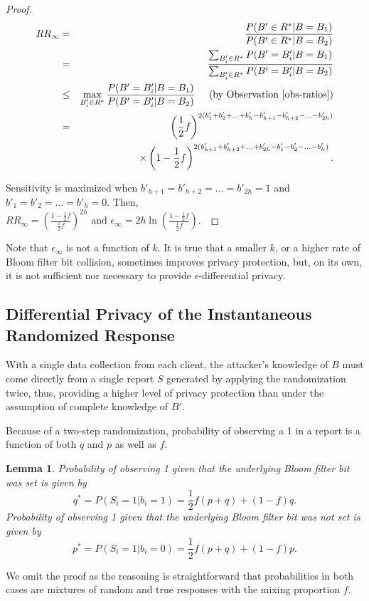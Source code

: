 \documentclass{sig-alternate-2013}
\newtheorem{lemma}{Lemma}
\begin{document}
\begin{proof}
\begin{eqnarray*}
RR_{\infty} & = &  \frac{P(B'\in R^* | B = B_1)}{P(B' \in R^* | B = B_2)} \\
                  & =  & \frac{\sum_{B'_i \in R^*}P(B' = B'_i |B = B_1)}{\sum_{B'_i \in R^*} P(B' = B'_i | B = B_2)} \\
                  & \le & \max_{B'_i \in R^*} \frac{P(B' = B'_i | B = B_1)}{P(B' = B'_i| B = B_2)}  \;\;\;\;\; \text{(by Observation~\ref{obs-ratios})} \\
                 & =  & \left(\frac{1}{2}f\right)^{2(b'_1 + b'_2 + \ldots + b'_h - b'_{h+1} - b'_{h+2} - \ldots - b'_{2h})} \\
                  & & \times \left(1 - \frac{1}{2}f\right)^{2(b'_{h+1} + b'_{h+2} + \ldots + b'_{2h} - b'_1 - b'_2 - \ldots - b'_h)}.
\end{eqnarray*}

Sensitivity is maximized when $b'_{h+1} = b'_{h+2} = \ldots = b'_{2h} = 1$ and $b'_1 = b'_2 = \ldots = b'_h = 0$. Then,\\
$
RR_{\infty} = \left(\frac{1 - \frac{1}{2}f}{\frac{1}{2}f}\right)^{2h} \text{~and~}
\epsilon_{\infty} = 2h\ln\left(\frac{1 - \frac{1}{2}f}{\frac{1}{2}f}\right).
$~\end{proof}

Note that $\epsilon_{\infty}$ is not a function of $k$. It is true that a smaller $k$, or a higher rate of Bloom filter bit collision, sometimes improves privacy protection, but, on its own, it is not sufficient nor necessary to provide $\epsilon$-differential privacy.

\subsection{Differential Privacy of the Instantaneous Randomized Response}
With a single data collection from each client, the attacker's knowledge of $B$ must come directly from a single report $S$ generated by applying the randomization twice, thus, providing a higher level of privacy protection than under the assumption of complete knowledge of $B'$.

Because of a two-step randomization, probability of observing a 1 in a report is a function of both $q$ and $p$ as well as $f$.
\begin{lemma}\label{lem-one}
Probability of observing 1 given that the underlying Bloom filter bit was set is given by
$$
q^* = P(S_i = 1 | b_i = 1) = \frac{1}{2}f(p + q) + (1 - f)q.
$$
Probability of observing 1 given that the underlying Bloom filter bit was \emph{not} set is given by
$$
p^* = P(S_i = 1 | b_i = 0) = \frac{1}{2}f(p + q) + (1 - f)p.
$$
\end{lemma}
We omit the proof as the reasoning is straightforward that probabilities in both cases are mixtures of random and true responses with the mixing proportion $f$.
\end{document}
